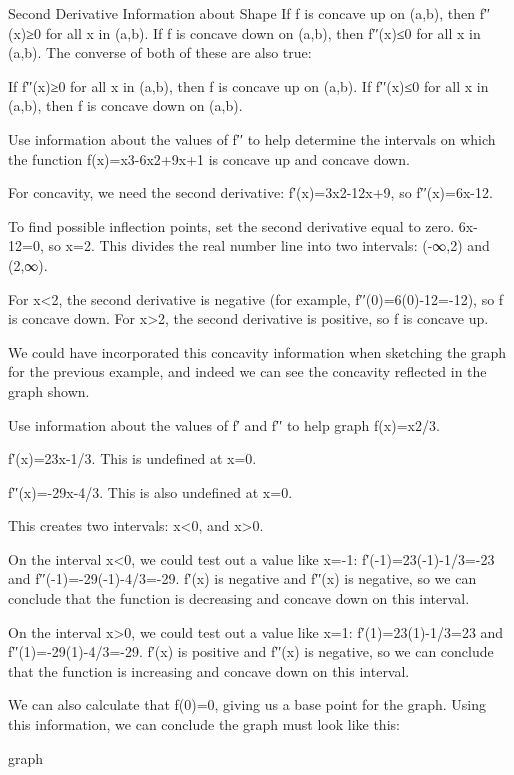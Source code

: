 Second Derivative Information about Shape
If f is concave up on (a,b), then f′′(x)≥0 for all x in (a,b).
If f is concave down on (a,b), then f′′(x)≤0 for all x in (a,b).
The converse of both of these are also true:

If f′′(x)≥0 for all x in (a,b), then f is concave up on (a,b).
If f′′(x)≤0 for all x in (a,b), then f is concave down on (a,b).
\begin{example}
Use information about the values of f′′ to help determine the intervals on which the function f(x)=x3-6x2+9x+1 is concave up and concave down.

\begin{solution} For concavity, we need the second derivative: f′(x)=3x2-12x+9, so f′′(x)=6x-12.

To find possible inflection points, set the second derivative equal to zero. 6x-12=0, so x=2. This divides the real number line into two intervals: (-∞,2) and (2,∞).

For x<2, the second derivative is negative (for example, f′′(0)=6(0)-12=-12), so f is concave down. For x>2, the second derivative is positive, so f is concave up.

We could have incorporated this concavity information when sketching the graph for the previous example, and indeed we can see the concavity reflected in the graph shown.
\end{solution}\end{example}

\begin{example}
Use information about the values of f′ and f′′ to help graph f(x)=x2/3.

\begin{solution} f′(x)=23x-1/3. This is undefined at x=0.

f′′(x)=-29x-4/3. This is also undefined at x=0.

This creates two intervals: x<0, and x>0.

On the interval x<0, we could test out a value like x=-1:
f′(-1)=23(-1)-1/3=-23
and
f′′(-1)=-29(-1)-4/3=-29.
f′(x) is negative and f′′(x) is negative, so we can conclude that the function is decreasing and concave down on this interval.

On the interval x>0, we could test out a value like x=1:
f′(1)=23(1)-1/3=23
and
f′′(1)=-29(1)-4/3=-29.
f′(x) is positive and f′′(x) is negative, so we can conclude that the function is increasing and concave down on this interval.

We can also calculate that f(0)=0, giving us a base point for the graph. Using this information, we can conclude the graph must look like this:

graph
\end{solution}\end{example}


